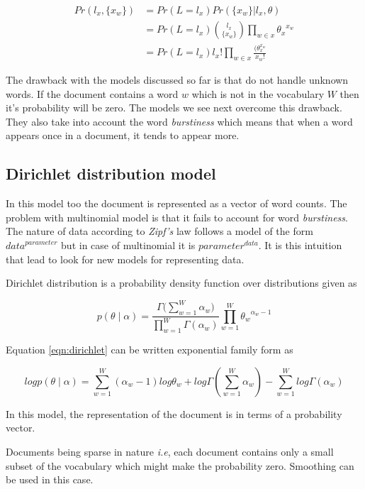 \begin{align}
 Pr(l_x,\{ x_w \})	& = Pr(L=l_x)Pr(\{x_w\}|l_x,\theta) \\
			& = Pr(L=l_x) {{l_x} \choose {\{x_w\}}} \prod_{w \in x} {\theta_x}^{x_w} \\
			& = Pr(L=l_x) l_x! \prod_{w \in x} \frac{(\theta_x^{x_w}}{x_w!}
\end{align}

The drawback with the models discussed so far is that do not handle unknown words. If the document contains a word \(w\) which
is not in the vocabulary \(W\) then it's probability will be zero. The models we see next overcome this drawback. They also
take into account the word \textit{burstiness} which means that when a word appears once in a document, it tends to appear more. 

\subsection{Dirichlet distribution model}

In this model too the document is represented as a vector of word counts. The problem with multinomial model is that it fails to 
account for word \textit{burstiness}. The nature of data according to \textit{Zipf's} law follows a model of the form \({data}^{parameter}\) but in
case of multinomial it is \({parameter}^{data}\). It is this intuition that lead to look for new models for representing data.

Dirichlet distribution is a probability density function over distributions given as

\begin{equation}\label{eqn:dirichlet}
 p(\theta \mid \alpha) = \frac{\Gamma \Big( \sum_{w=1}^W \alpha_w \Big)}{\prod_{w=1}^W \Gamma (\alpha_w)} \prod_{w=1}^W {\theta_w}^{\alpha_w - 1}
\end{equation}

Equation \ref{eqn:dirichlet} can be written exponential family form as

\begin{equation}
 logp(\theta \mid \alpha) = \sum_{w=1}^W (\alpha_w - 1) log \theta_w + log \Gamma (\sum_{w=1}^W \alpha_w) - \sum_{w=1}^W log\Gamma(\alpha_w)
\end{equation}

In this model, the representation of the document is in terms of a probability vector. 

Documents being sparse in nature \textit{i.e}, each document contains only a small subset of the vocabulary which might make the probability
zero. Smoothing can be used in this case. 

